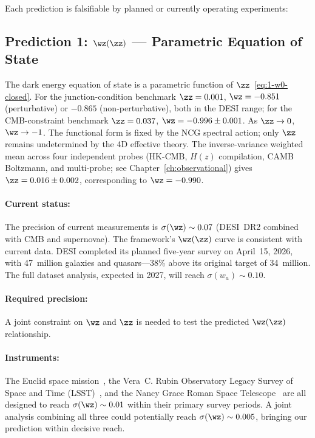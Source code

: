 Each prediction is falsifiable by planned or currently operating experiments:

\subsection{Prediction 1: \texorpdfstring{$\wz(\zz)$}{w0(zeta0)} --- Parametric Equation of State}
\label{sec:1-pred1}

The dark energy equation of state is a parametric function of $\zz$~\eqref{eq:1-w0-closed}. For the junction-condition benchmark $\zz = 0.001$, $\wz = -0.851$ (perturbative) or $-0.865$ (non-perturbative), both in the DESI range; for the CMB-constraint benchmark $\zz = 0.037$, $\wz = -0.996 \pm 0.001$. As $\zz \to 0$, $\wz \to -1$. The functional form is fixed by the NCG spectral action; only $\zz$ remains undetermined by the 4D effective theory. The inverse-variance weighted mean across four independent probes (HK-CMB, $H(z)$ compilation, CAMB Boltzmann, and multi-probe; see Chapter~\ref{ch:observational}) gives $\zz = 0.016 \pm 0.002$, corresponding to $\wz = -0.990$.

\paragraph{Current status:} The precision of current measurements is $\sigma(\wz) \sim 0.07$ (DESI~DR2 combined with CMB and supernovae). The framework's $\wz(\zz)$ curve is consistent with current data. DESI completed its planned five-year survey on April~15, 2026, with 47~million galaxies and quasars---38\% above its original target of 34~million. The full dataset analysis, expected in 2027, will reach $\sigma(w_a) \sim 0.10$.

\paragraph{Required precision:} A joint constraint on $\wz$ and $\zz$ is needed to test the predicted $\wz(\zz)$ relationship.

\paragraph{Instruments:} The Euclid space mission~\cite{ch1:euclid}, the Vera~C. Rubin Observatory Legacy Survey of Space and Time (LSST)~\cite{ch1:lsst}, and the Nancy Grace Roman Space Telescope~\cite{ch1:roman} are all designed to reach $\sigma(\wz) \sim 0.01$ within their primary survey periods. A joint analysis combining all three could potentially reach $\sigma(\wz) \sim 0.005$, bringing our prediction within decisive reach.

